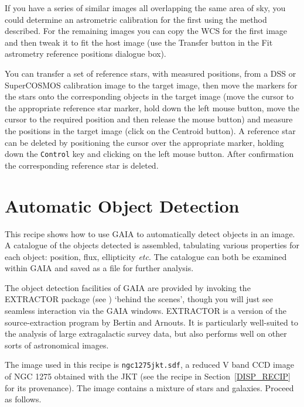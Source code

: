 \documentclass[twoside,11pt]{starlink}
\begin{document}
If you have a series of similar images all overlapping the same area of
sky, you could determine an astrometric calibration for the first using the
method described.  For the remaining images you can copy the WCS for the
first image and then tweak it to fit the host image (use the \textsf{Transfer}
button in the \textsf{Fit astrometry reference positions} dialogue box).

You can transfer a set of reference stars, with measured positions, from
a DSS or SuperCOSMOS calibration image to the target image, then move
the markers for the stars onto the corresponding objects in the target
image (move the cursor to the appropriate reference star marker, hold down
the left mouse button, move the cursor to the required position and then
release the mouse button) and measure the positions in the target image
(click on the \textsf{Centroid} button).  A reference star can be deleted by
positioning the cursor over the appropriate marker, holding down the \texttt{Control} key and clicking on the left mouse button.  After confirmation
the corresponding reference star is deleted.


\newpage
\section{\label{OBJDET_RECIP}Automatic Object
Detection}

This recipe shows how to use GAIA to automatically detect objects in an
image.  A catalogue of the objects detected is assembled, tabulating
various properties for each object: position, flux, ellipticity \emph{etc}.
The catalogue can both be examined within GAIA and saved as a file for
further analysis.

The object detection facilities of GAIA are provided by invoking the
EXTRACTOR package (see \cite{SUN226}) `behind the
scenes', though you will just see seamless interaction via the GAIA
windows.  EXTRACTOR is a version of the source-extraction program by
Bertin and Arnouts\cite{BERTIN96}.  It is particularly well-suited to the
analysis of large extragalactic survey data, but also performs well on
other sorts of astronomical images.

The image used in this recipe is \texttt{ngc1275jkt.sdf}, a reduced V band
CCD image of NGC 1275 obtained with the JKT (see the recipe in
Section~\ref{DISP_RECIP} for its provenance).  The image contains a mixture
of stars and galaxies.  Proceed as follows.
\end{document}
